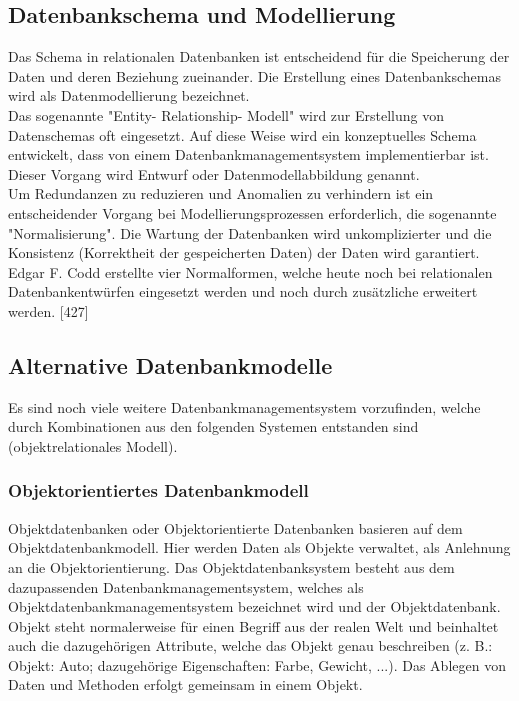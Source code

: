 \documentclass[12pt,a4paper]{report}
\begin{document}
\begin{onehalfspace}
\subsection{Datenbankschema und Modellierung}
Das Schema in relationalen Datenbanken ist entscheidend für die Speicherung der Daten und deren Beziehung zueinander. Die Erstellung eines Datenbankschemas wird als Datenmodellierung bezeichnet.\\

Das sogenannte "{}Entity- Relationship- Modell"{} wird zur Erstellung von Datenschemas oft eingesetzt. Auf diese Weise wird ein konzeptuelles Schema entwickelt, dass von einem Datenbankmanagementsystem implementierbar ist. Dieser Vorgang wird Entwurf oder Datenmodellabbildung genannt.\\

Um Redundanzen zu reduzieren und Anomalien zu verhindern ist ein entscheidender Vorgang bei Modellierungsprozessen erforderlich, die sogenannte "{}Normalisierung"{}. Die Wartung der Datenbanken wird unkomplizierter und die Konsistenz (Korrektheit der gespeicherten Daten) der Daten wird garantiert.\\

Edgar F. Codd erstellte vier Normalformen, welche heute noch bei relationalen Datenbankentwürfen eingesetzt werden und noch durch zusätzliche erweitert werden. 
[427]
\subsection{Alternative Datenbankmodelle}
Es sind noch viele weitere Datenbankmanagementsystem vorzufinden, welche durch Kombinationen aus den folgenden Systemen entstanden sind (objektrelationales Modell).
\subsubsection{Objektorientiertes Datenbankmodell}
Objektdatenbanken oder Objektorientierte Datenbanken basieren auf dem Objektdatenbankmodell. Hier werden Daten als Objekte verwaltet, als Anlehnung an die Objektorientierung. Das Objektdatenbanksystem besteht aus dem dazupassenden Datenbankmanagementsystem, welches als Objektdatenbankmanagementsystem bezeichnet wird und der Objektdatenbank.\\

Objekt steht normalerweise für einen Begriff aus der realen Welt und beinhaltet auch die dazugehörigen Attribute, welche das Objekt genau beschreiben (z. B.: Objekt: Auto; dazugehörige Eigenschaften: Farbe, Gewicht, ...). Das Ablegen von Daten und Methoden erfolgt gemeinsam in einem Objekt.\\


\end{onehalfspace}
\end{document}
